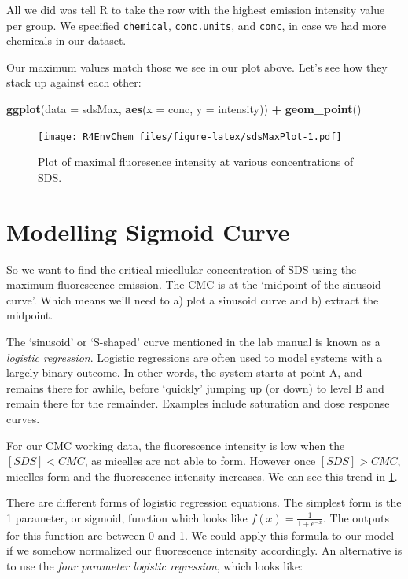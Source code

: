 \documentclass[
]{book}
\newenvironment{Shaded}{\begin{snugshade}}{\end{snugshade}}
\newcommand{\AttributeTok}[1]{\textcolor[rgb]{0.13,0.29,0.53}{#1}}
\newcommand{\FunctionTok}[1]{\textcolor[rgb]{0.13,0.29,0.53}{\textbf{#1}}}
\newcommand{\NormalTok}[1]{#1}
\newcommand{\SpecialCharTok}[1]{\textcolor[rgb]{0.81,0.36,0.00}{\textbf{#1}}}
\begin{document}
All we did was tell R to take the row with the highest emission intensity value per group. We specified \texttt{chemical}, \texttt{conc.units}, and \texttt{conc}, in case we had more chemicals in our dataset.

Our maximum values match those we see in our plot above. Let's see how they stack up against each other:

\begin{Shaded}
\begin{Highlighting}[]
\FunctionTok{ggplot}\NormalTok{(}\AttributeTok{data =}\NormalTok{ sdsMax, }
       \FunctionTok{aes}\NormalTok{(}\AttributeTok{x =}\NormalTok{ conc, }
           \AttributeTok{y =}\NormalTok{ intensity)) }\SpecialCharTok{+}
  \FunctionTok{geom\_point}\NormalTok{() }
\end{Highlighting}
\end{Shaded}

\begin{figure}
\centering
\texttt{[image: R4EnvChem\_files/figure-latex/sdsMaxPlot-1.pdf]}
\caption{\label{fig:sdsMaxPlot}Plot of maximal fluoresence intensity at various concentrations of SDS.}
\end{figure}

\hypertarget{modelling-sigmoid-curve}{%
\section{Modelling Sigmoid Curve}\label{modelling-sigmoid-curve}}

So we want to find the critical micellular concentration of SDS using the maximum fluorescence emission. The CMC is at the `midpoint of the sinusoid curve'. Which means we'll need to a) plot a sinusoid curve and b) extract the midpoint.

The `sinusoid' or `S-shaped' curve mentioned in the lab manual is known as a \emph{logistic regression}. Logistic regressions are often used to model systems with a largely binary outcome. In other words, the system starts at point A, and remains there for awhile, before `quickly' jumping up (or down) to level B and remain there for the remainder. Examples include saturation and dose response curves.

For our CMC working data, the fluorescence intensity is low when the \([SDS] < CMC\), as micelles are not able to form. However once \([SDS] > CMC\), micelles form and the fluorescence intensity increases. We can see this trend in \ref{fig:sdsMaxPlot}.

There are different forms of logistic regression equations. The simplest form is the 1 parameter, or sigmoid, function which looks like \(f(x) = \frac{1}{1+e^{-x}}\). The outputs for this function are between 0 and 1. We could apply this formula to our model if we somehow normalized our fluorescence intensity accordingly. An alternative is to use the \emph{four parameter logistic regression}, which looks like:
\end{document}
